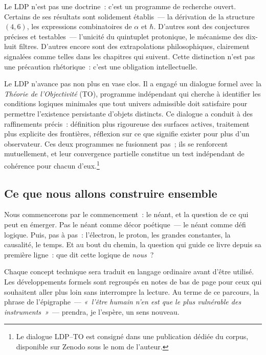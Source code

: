 \documentclass[12pt, a4paper, openright]{book}
\begin{document}
Le LDP n'est pas une doctrine~: c'est un programme de recherche ouvert. Certains de ses résultats sont solidement établis~--- la dérivation de la structure $(4,6)$, les expressions combinatoires de $\alpha$ et $\hbar$. D'autres sont des conjectures précises et testables~--- l'unicité du quintuplet protonique, le mécanisme des dix-huit filtres. D'autres encore sont des extrapolations philosophiques, clairement signalées comme telles dans les chapitres qui suivent. Cette distinction n'est pas une précaution rhétorique~: c'est une obligation intellectuelle.

\medskip

Le LDP n'avance pas non plus en vase clos. Il a engagé un dialogue formel avec la \emph{Théorie de l'Objectivité} (TO), programme indépendant qui cherche à identifier les conditions logiques minimales que tout univers admissible doit satisfaire pour permettre l'existence persistante d'objets distincts. Ce dialogue a conduit à des raffinements précis~: définition plus rigoureuse des surfaces actives, traitement plus explicite des frontières, réflexion sur ce que signifie \og exister pour plus d'un observateur\fg{}. Ces deux programmes ne fusionnent pas~; ils se renforcent mutuellement, et leur convergence partielle constitue un test indépendant de cohérence pour chacun d'eux.\footnote{Le dialogue LDP--TO est consigné dans une publication dédiée du corpus, disponible sur Zenodo sous le nom de l'auteur.}

\subsection*{Ce que nous allons construire ensemble}

Nous commencerons par le commencement~: le néant, et la question de ce qui peut en émerger. Pas le néant comme décor poétique~--- le néant comme défi logique. Puis, pas à pas~: l'électron, le proton, les grandes constantes, la causalité, le temps. Et au bout du chemin, la question qui guide ce livre depuis sa première ligne~: que dit cette logique de \emph{nous}~?

\medskip

Chaque concept technique sera traduit en langage ordinaire avant d'être utilisé. Les développements formels sont regroupés en notes de bas de page pour ceux qui souhaitent aller plus loin sans interrompre la lecture. Au terme de ce parcours, la phrase de l'épigraphe~--- \textit{«~l'être humain n'en est que le plus vulnérable des instruments~»}~--- prendra, je l'espère, un sens nouveau.
\end{document}

